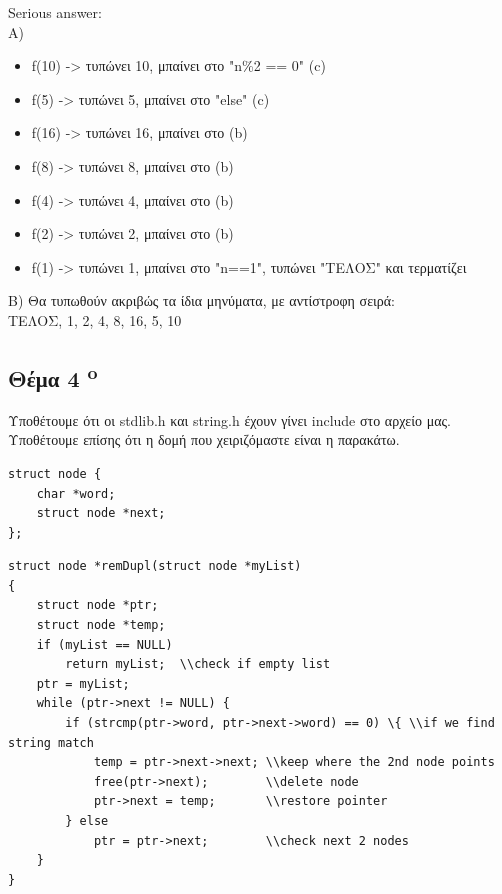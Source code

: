 \documentclass[a4paper,10pt]{article}
\begin{document}
Serious answer:\\
A)
\begin{itemize}
	\item f(10)	-> τυπώνει 10, μπαίνει στο "n\%2 == 0" (c)
	\item f(5)	-> τυπώνει 5,  μπαίνει στο "else" (c)
	\item f(16)	-> τυπώνει 16,  μπαίνει στο (b)
	\item f(8)	-> τυπώνει 8,  μπαίνει στο (b)
	\item f(4)	-> τυπώνει 4,  μπαίνει στο (b)
	\item f(2)	-> τυπώνει 2,  μπαίνει στο (b)
	\item f(1)	-> τυπώνει 1,  μπαίνει στο "n==1", τυπώνει "ΤΕΛΟΣ" και τερματίζει
\end{itemize}

B) Θα τυπωθούν ακριβώς τα ίδια μηνύματα, με αντίστροφη σειρά:\\
ΤΕΛΟΣ, 1, 2, 4, 8, 16, 5, 10

\subsection{Θέμα 4 \textsuperscript{o}}

Υποθέτουμε ότι οι stdlib.h και string.h έχουν γίνει include στο αρχείο μας.\\
Υποθέτουμε επίσης ότι η δομή που χειριζόμαστε είναι η παρακάτω.

\begin{lstlisting}
struct node {
	char *word;
	struct node *next;
};
\end{lstlisting}

\begin{lstlisting}
struct node *remDupl(struct node *myList)
{
	struct node *ptr;
	struct node *temp;
	if (myList == NULL)
		return myList;	\\check if empty list
	ptr = myList;
	while (ptr->next != NULL) {
		if (strcmp(ptr->word, ptr->next->word) == 0) \{	\\if we find string match
			temp = ptr->next->next;	\\keep where the 2nd node points
			free(ptr->next);		\\delete node
			ptr->next = temp;		\\restore pointer
		} else
			ptr = ptr->next;		\\check next 2 nodes
	}
}
\end{lstlisting}

\end{document}
